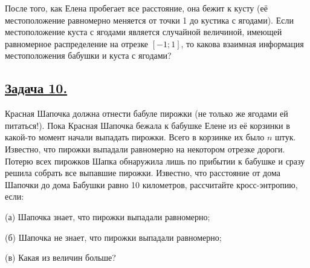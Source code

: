 После того, как Елена пробегает все расстояние, она бежит к кусту (её местоположение равномерно меняется от точки 1 до кустика с ягодами). Если местоположение куста с ягодами является случайной величиной, имеющей равномерное распределение на отрезке $[-1; 1]$, то какова взаимная информация местоположения бабушки и куста с ягодами?
 
\subsection*{\hyperref[sec:sol_problem10]{Задача 10.}}\label{sec:problem10} Красная Шапочка должна отнести бабуле пирожки (не только же ягодами ей питаться!). Пока Красная Шапочка бежала к бабушке Елене из её корзинки в какой-то момент начали выпадать пирожки. Всего в корзинке их было $n$ штук. Известно, что пирожки выпадали равномерно на некотором отрезке дороги. Потерю всех пирожков Шапка обнаружила лишь по прибытии к бабушке и сразу решила собрать все выпавшие пирожки. Известно, что расстояние от дома Шапочки до дома Бабушки равно 10 километров, рассчитайте кросс-энтропию, если:

(а) Шапочка знает, что пирожки выпадали равномерно;

(б) Шапочка не знает, что пирожки выпадали равномерно;

(в) Какая из величин больше?

